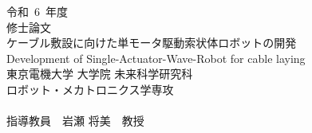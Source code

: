 ﻿\documentclass[a4j,11pt,onecolumn,oneside,titlepage,final]{jreport_sadasue}
\renewcommand{\nenndo}{6} %
\renewcommand{\thesis}{修士論文} %
\renewcommand{\belonging}{東京電機大学 大学院 未来科学研究科\\ロボット・メカトロニクス学専攻} %
\renewcommand{\advisorname}{岩瀬 将美} %
\renewcommand{\advisor}{教授} %
\renewcommand{\coadvisorname}{佐藤 康之} %
\renewcommand{\coadvisor}{准教授} %
\theoremstyle{definition}
\begin{document}
\begin{titlepage}
  \begin{center}
      {\huge 令和~\nenndo~年度 }\\[10mm]
      {\LARGE \thesis}\\[20mm]
      {\LARGE ケーブル敷設に向けた単モータ駆動索状体ロボットの開発}\\[5mm]
      {\LARGE Development of Single-Actuator-Wave-Robot for cable laying}\\[60mm]
      {\LARGE \belonging}\\[10mm]
      {\LARGE \studentid~\studentname}\\[20mm]
      {\LARGE 指導教員~~\advisorname~~\advisor }
  \end{center}
\end{titlepage}

\tableofcontents %
\listoffigures   %
\listoftables    %

\newpage%


\newpage%




\end{document}

